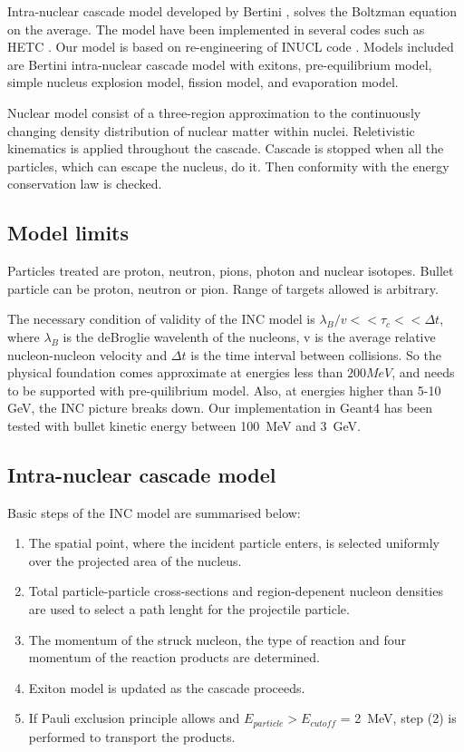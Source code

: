 \documentclass[twocolumn,twoside,slac]{revtex4}
\begin{document}
Intra-nuclear cascade model developed by Bertini \cite{bertini68, bertini69, bertini71}, solves the Boltzman equation on the average.
The model have been implemented in several codes such as HETC \cite{alsmiller90}. 
Our model is based on re-engineering of INUCL code \cite{titarenko99a}.
Models included are Bertini intra-nuclear cascade model with exitons, pre-equilibrium model, simple nucleus explosion model, fission model, and evaporation model. 

Nuclear model consist of a three-region approximation to the continuously changing density distribution of nuclear matter within nuclei.
Reletivistic kinematics is applied throughout the cascade.
Cascade is stopped when all the particles, which can escape the nucleus, do it. 
Then conformity with the energy conservation law is checked.


\subsection{Model limits}

Particles treated are proton, neutron, pions, photon and nuclear isotopes.
Bullet particle can be proton, neutron or  pion.
Range of targets allowed is arbitrary.

The necessary condition of validity of the INC model is $\lambda_{B} / v << \tau_{c} << \Delta t$, 
where $\lambda_{B}$ is the deBroglie wavelenth of the nucleons, 
v is the average relative nucleon-nucleon velocity and $\Delta t$ is the time interval between collisions.
So the physical foundation comes approximate at energies less than $200 MeV$, and needs to be supported with pre-quilibrium model.
Also, at energies higher than 5-10 GeV, the INC picture breaks down.
Our implementation in Geant4 has been tested with bullet kinetic energy between 100~MeV and 3~GeV.

\subsection{Intra-nuclear cascade model}

Basic steps of the INC model are summarised below:

\begin{enumerate}
\item The spatial point, where the incident particle enters, is selected uniformly over the projected area of the nucleus.
\item Total particle-particle cross-sections and region-depenent nucleon densities are used to select a path lenght for the projectile particle.
\item The momentum of the struck nucleon, the type of reaction and four momentum of the reaction products are determined.
\item Exiton model is updated as the cascade proceeds.
\item If Pauli exclusion principle allows and $E_{particle} > E_{cutoff}$ = 2~MeV, step (2) is performed to transport the products.
\end{enumerate}
\end{document}
